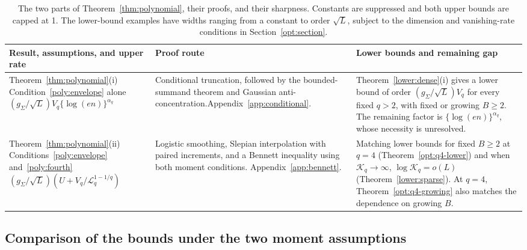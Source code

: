 \documentclass[11pt,letterpaper,twoside,leqno]{article}
\theoremstyle{bookplain}
\theoremstyle{bookremark}
\begin{document}
\begin{table}[htbp]
\centering

\small
\renewcommand{\arraystretch}{1.15}
\begin{tabularx}{\textwidth}{@{}>{\raggedright\arraybackslash}p{}
 >{\raggedright\arraybackslash}p{}
 >{\raggedright\arraybackslash}X@{}}
\toprule
Result, assumptions, and upper rate & Proof route & Lower bounds and remaining gap\\
\midrule
Theorem~\ref{thm:polynomial}\textup{(i)}\newline
Condition~\eqref{poly:envelope} alone\newline
\((g_\Sigma/\sqrt L)V_q\{\log(en)\}^{\alpha_q}\)
& Conditional truncation, followed by the bounded-summand theorem and
Gaussian anti-concentration.\newline Appendix~\ref{app:conditional}.
& Theorem~\ref{lower:dense}\textup{(i)} gives a lower bound of order
\((g_\Sigma/\sqrt L)V_q\) for every fixed \(q>2\),
with fixed or growing \(B\ge2\).
The remaining factor is \(\{\log(en)\}^{\alpha_q}\), whose
necessity is unresolved.\\[0.6em]
Theorem~\ref{thm:polynomial}\textup{(ii)}\newline
Conditions~\eqref{poly:envelope} and~\eqref{poly:fourth}\newline
\((g_\Sigma/\sqrt L)(U+V_q/\mathcal L_q^{1-1/q})\)
& Logistic smoothing, Slepian interpolation with paired increments, and
a Bennett inequality using both moment conditions.\newline
Appendix~\ref{app:bennett}.
& Matching lower bounds for fixed \(B\ge2\) at \(q=4\)
(Theorem~\ref{opt:q4-lower}) and when \(\mathcal K_q\to\infty\), \(\log\mathcal K_q=o(L)\)
(Theorem~\ref{lower:sparse}). At \(q=4\),
Theorem~\ref{opt:q4-growing} also matches the dependence on growing \(B\).\\
\bottomrule
\end{tabularx}
\caption{The two parts of Theorem~\ref{thm:polynomial}, their proofs,
and their sharpness. Constants are suppressed and both upper bounds
are capped at 1. The lower-bound examples have widths
ranging from a constant to order \(\sqrt L\), subject to the
dimension and vanishing-rate conditions in Section~\ref{opt:section}.}
\label{poly:summary}
\end{table}

\subsection{\texorpdfstring{{Comparison of the bounds under the two moment assumptions}}{Comparison of the bounds under the two moment assumptions}}\label{poly:transition}
\end{document}
